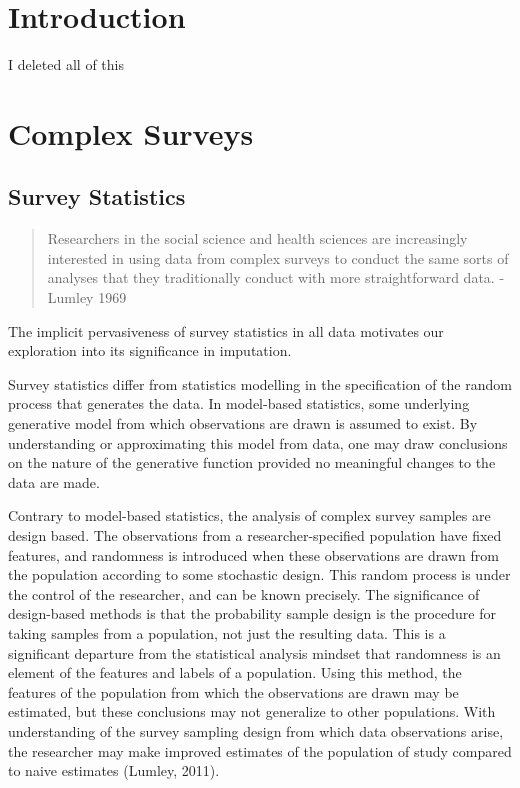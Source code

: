 \documentclass[12pt,twoside]{reedthesis}
\begin{document}
\chapter*{Introduction}\label{introduction}

I deleted all of this

\chapter{Complex Surveys}\label{complex-surveys}

\section{Survey Statistics}\label{survey-statistics}
\begin{quote}
Researchers in the social science and health sciences are increasingly
interested in using data from complex surveys to conduct the same sorts
of analyses that they traditionally conduct with more straightforward
data. - Lumley 1969
\end{quote}
The implicit pervasiveness of survey statistics in all data motivates
our exploration into its significance in imputation.

Survey statistics differ from statistics modelling in the specification
of the random process that generates the data. In model-based
statistics, some underlying generative model from which observations are
drawn is assumed to exist. By understanding or approximating this model
from data, one may draw conclusions on the nature of the generative
function provided no meaningful changes to the data are made.

Contrary to model-based statistics, the analysis of complex survey
samples are design based. The observations from a researcher-specified
population have fixed features, and randomness is introduced when these
observations are drawn from the population according to some stochastic
design. This random process is under the control of the researcher, and
can be known precisely. The significance of design-based methods is that
the probability sample design is the procedure for taking samples from a
population, not just the resulting data. This is a significant departure
from the statistical analysis mindset that randomness is an element of
the features and labels of a population. Using this method, the features
of the population from which the observations are drawn may be
estimated, but these conclusions may not generalize to other
populations. With understanding of the survey sampling design from which
data observations arise, the researcher may make improved estimates of
the population of study compared to naive estimates (Lumley, 2011).
\end{document}

